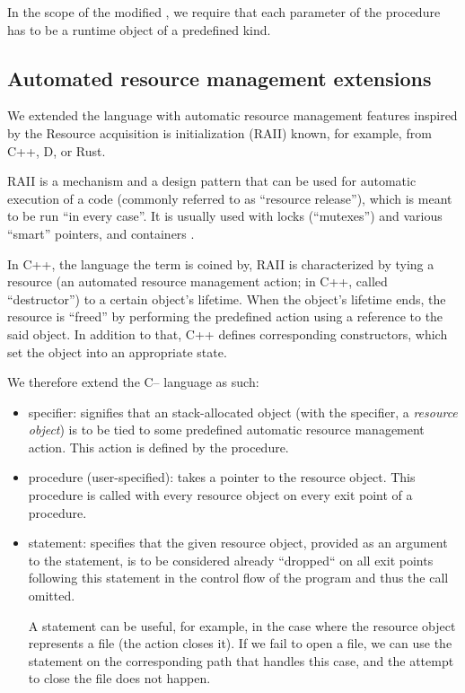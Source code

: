 In the scope of the modified \cmm, we require that each parameter of the  procedure has to be a runtime object of a predefined kind.

\subsection{Automated resource management extensions}
\label{RAII}

We extended the \cmm language with automatic resource management features inspired by the Resource acquisition is initialization (RAII) known, for example, from C++, D, or Rust.

RAII is a mechanism and a design pattern that can be used for automatic execution of a code (commonly referred to as ``resource release''), which is meant to be run ``in every case''. It is usually used with locks (``mutexes'') and various ``smart'' pointers, and containers \cite{obiltschnigusing}.

In C++, the language the term is coined by, RAII is characterized by tying a resource (an automated resource management action; in C++, called ``destructor'') to a certain object's lifetime. When the object's lifetime ends, the resource is ``freed'' by performing the predefined action using a reference to the said object. In addition to that, C++ defines corresponding constructors, which set the object into an appropriate state.

We therefore extend the C-- language as such:

\begin{itemize}
    \item {} specifier: signifies that an stack-allocated object (with the  specifier, a \emph{resource object}) is to be tied to some predefined automatic resource management action. This action is defined by the  procedure.

    \item {} procedure (user-specified): takes a pointer to the resource object. This procedure is called with every resource object on every exit point of a procedure.

    \item {} statement: specifies that the given resource object, provided as an argument to the  statement, is to be considered already ``dropped`` on all exit points following this statement in the control flow of the program and thus the  call omitted.

    A  statement can be useful, for example, in the case where the resource object represents a file (the  action closes it). If we fail to open a file, we can use the  statement on the corresponding path that handles this case, and the attempt to close the file does not happen.
\end{itemize}

